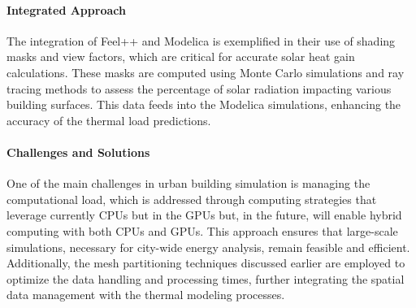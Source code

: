 \documentclass[runningheads]{llncs}
\begin{document}
\paragraph{Integrated Approach}
The integration of Feel++ and Modelica is exemplified in their use of shading masks and view factors, which are critical for accurate solar heat gain calculations. These masks are computed using Monte Carlo simulations and ray tracing methods to assess the percentage of solar radiation impacting various building surfaces. This data feeds into the Modelica simulations, enhancing the accuracy of the thermal load predictions.

\paragraph{Challenges and Solutions}
One of the main challenges in urban building simulation is managing the computational load, which is addressed through computing strategies that leverage currently CPUs but in the GPUs but, in the future, will enable hybrid computing with both CPUs and GPUs. This approach ensures that large-scale simulations, necessary for city-wide energy analysis, remain feasible and efficient. Additionally, the mesh partitioning techniques discussed earlier are employed to optimize the data handling and processing times, further integrating the spatial data management with the thermal modeling processes.




\end{document}
